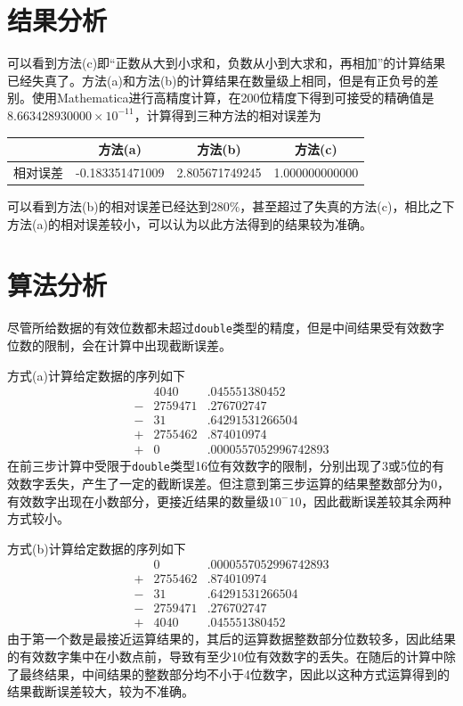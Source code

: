 \documentclass[11pt]{article}
\begin{document}
\section{结果分析}
可以看到方法(c)即“正数从大到小求和，负数从小到大求和，再相加”的计算结果已经失真了。方法(a)和方法(b)的计算结果在数量级上相同，但是有正负号的差别。使用Mathematica进行高精度计算，在200位精度下得到可接受的精确值是$8.663428930000\times 10 ^ {-11}$，计算得到三种方法的相对误差为
\begin{table}[h]
    \centering
    \begin{tabular}{|c|c|c|c|}
        \hline
                 & 方法(a)         & 方法(b)        & 方法(c)        \\ \hline
        相对误差 & -0.183351471009 & 2.805671749245 & 1.000000000000 \\ \hline
    \end{tabular}
\end{table}
可以看到方法(b)的相对误差已经达到280\%，甚至超过了失真的方法(c)，相比之下方法(a)的相对误差较小，可以认为以此方法得到的结果较为准确。

\section{算法分析}
尽管所给数据的有效位数都未超过\texttt{double}类型的精度，但是中间结果受有效数字位数的限制，会在计算中出现截断误差。

方式(a)计算给定数据的序列如下
\begin{align*}
     &   & 4040    & .045551380452        & \\
     & - & 2759471 & .276702747           & \\
     & - & 31      & .64291531266504      & \\
     & + & 2755462 & .874010974           & \\
     & + & 0       & .0000557052996742893 &
\end{align*}
在前三步计算中受限于\texttt{double}类型16位有效数字的限制，分别出现了3或5位的有效数字丢失，产生了一定的截断误差。但注意到第三步运算的结果整数部分为0，有效数字出现在小数部分，更接近结果的数量级$10^-10$，因此截断误差较其余两种方式较小。

方式(b)计算给定数据的序列如下
\begin{align*}
     &   & 0       & .0000557052996742893 & \\
     & + & 2755462 & .874010974           & \\
     & - & 31      & .64291531266504      & \\
     & - & 2759471 & .276702747           & \\
     & + & 4040    & .045551380452        &
\end{align*}
由于第一个数是最接近运算结果的，其后的运算数据整数部分位数较多，因此结果的有效数字集中在小数点前，导致有至少10位有效数字的丢失。在随后的计算中除了最终结果，中间结果的整数部分均不小于4位数字，因此以这种方式运算得到的结果截断误差较大，较为不准确。
\end{document}
